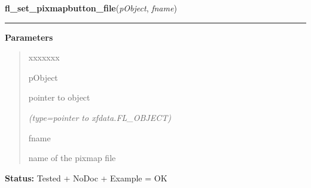 \hspace{.8\funcindent}\begin{boxedminipage}{\funcwidth}

    \raggedright \textbf{fl\_set\_pixmapbutton\_file}(\textit{pObject}, \textit{fname})

    \vspace{-1.5ex}

    \rule{\textwidth}{0.5\fboxrule}
\setlength{\parskip}{2ex}
\setlength{\parskip}{1ex}
      \textbf{Parameters}
      \vspace{-1ex}

      \begin{quote}
        \begin{Ventry}{xxxxxxx}

          \item[pObject]

          pointer to object

            {\it (type=pointer to xfdata.FL\_OBJECT)}

          \item[fname]

          name of the pixmap file

        \end{Ventry}

      \end{quote}

\textbf{Status:} Tested + NoDoc + Example = OK



    \end{boxedminipage}

    \label{xformslib:library:fl_set_pixmap_file}

    \vspace{0.5ex}

